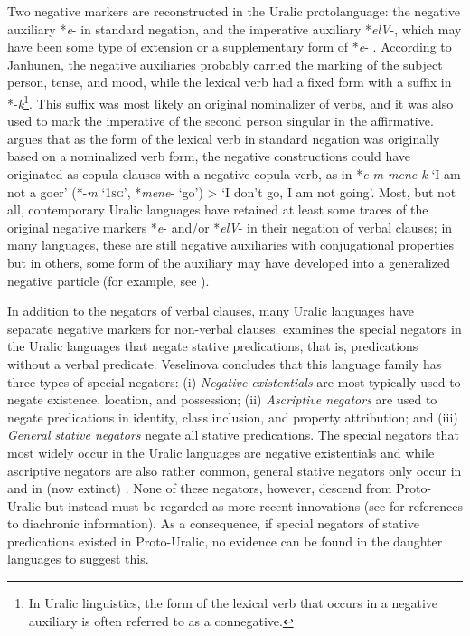 \documentclass[output=paper,colorlinks,citecolor=brown,draft,draftmode]{langscibook}
\begin{document}
Two negative markers are reconstructed in the Uralic protolanguage: the negative auxiliary *\textit{e}- in standard negation, and the imperative auxiliary *\textit{elV}-, which may have been some type of extension or a supplementary form of *\textit{e}- \citep[37]{Janhunen1982}. According to Janhunen, the negative auxiliaries probably carried the marking of the subject person, tense, and mood, while the lexical verb had a fixed form with a suffix in *-\textit{k}\footnote{In Uralic linguistics, the form of the lexical verb that occurs in a negative auxiliary is often referred to as a connegative.}. This suffix was most likely an original nominalizer of verbs, and it was also used to mark the imperative of the second person singular in the affirmative. \citet[241--242]{Honti1997} argues that as the form of the lexical verb in standard negation was originally based on a nominalized verb form, the negative constructions could have originated as copula clauses with a negative copula verb, as in *\textit{e-m mene-k} `I am not a goer' (*-\textit{m} `1\textsc{sg}', *\textit{mene}- `go') > `I don't go, I am not going'. Most, but not all, contemporary Uralic languages have retained at least some traces of the original negative markers *\textit{e}- and/or *\textit{elV}- in their negation of verbal clauses; in many languages, these are still negative auxiliaries with conjugational properties but in others, some form of the auxiliary may have developed into a generalized negative particle (for example, see \citealt{Comrie1981}).

  In addition to the negators of verbal clauses, many Uralic languages have separate negative markers for non-verbal clauses. \citet{Veselinova2015} examines the special negators in the Uralic languages that negate stative predications, that is, predications without a verbal predicate. Veselinova concludes that this language family has three types of special negators: (i) \textit{Negative existentials} are most typically used to negate existence, location, and possession; (ii) \textit{Ascriptive negators} are used to negate predications in identity, class inclusion, and property attribution; and (iii) \textit{General stative negators} negate all stative predications. The special negators that most widely occur in the Uralic languages are negative existentials and while ascriptive negators are also rather common, general stative negators only occur in  and in (now extinct) . None of these negators, however, descend from Proto-Uralic but instead must be regarded as more recent innovations (see \citealt[567--568, 570--571, 572]{Veselinova2015} for references to diachronic information). As a consequence, if special negators of stative predications existed in Proto-Uralic, no evidence can be found in the daughter languages to suggest this.
\end{document}
